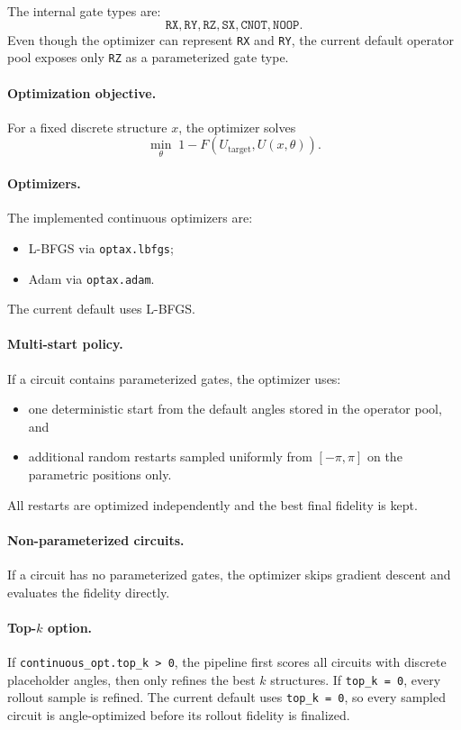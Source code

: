 \documentclass[11pt]{article}
\begin{document}
The internal gate types are:
\[
\texttt{RX}, \texttt{RY}, \texttt{RZ}, \texttt{SX}, \texttt{CNOT}, \texttt{NOOP}.
\]
Even though the optimizer can represent \texttt{RX} and \texttt{RY}, the current default operator pool exposes only \texttt{RZ} as a parameterized gate type.

\paragraph{Optimization objective.}
For a fixed discrete structure $x$, the optimizer solves
\[
\min_{\theta} \; 1 - F\!\left(U_{\mathrm{target}}, U(x,\theta)\right).
\]

\paragraph{Optimizers.}
The implemented continuous optimizers are:
\begin{itemize}[leftmargin=*]
\item L-BFGS via \texttt{optax.lbfgs};
\item Adam via \texttt{optax.adam}.
\end{itemize}

The current default uses L-BFGS.

\paragraph{Multi-start policy.}
If a circuit contains parameterized gates, the optimizer uses:
\begin{itemize}[leftmargin=*]
\item one deterministic start from the default angles stored in the operator pool, and
\item additional random restarts sampled uniformly from $[-\pi,\pi]$ on the parametric positions only.
\end{itemize}

All restarts are optimized independently and the best final fidelity is kept.

\paragraph{Non-parameterized circuits.}
If a circuit has no parameterized gates, the optimizer skips gradient descent and evaluates the fidelity directly.

\paragraph{Top-$k$ option.}
If \texttt{continuous\_opt.top\_k > 0}, the pipeline first scores all circuits with discrete placeholder angles, then only refines the best $k$ structures.
If \texttt{top\_k = 0}, every rollout sample is refined.
The current default uses \texttt{top\_k = 0}, so every sampled circuit is angle-optimized before its rollout fidelity is finalized.
\end{document}
